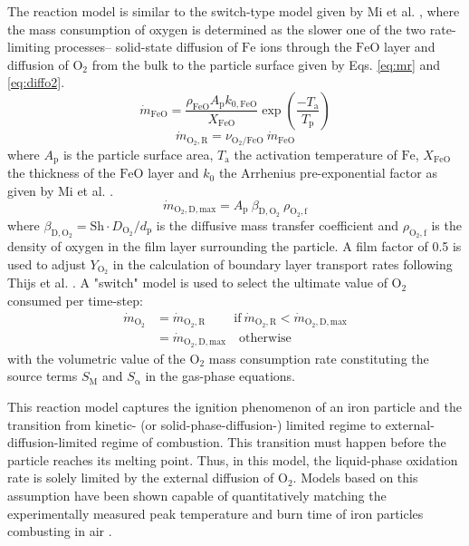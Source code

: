 \documentclass[twocolumn,10pt,dvipsnames]{article} %
\newcommand{\mrm}[1]{\mathrm{#1}}
\begin{document}
The reaction model is similar to the switch-type model given by Mi et al. \cite{mi2022quantitative,jean2023ignition}, where the mass consumption of oxygen is determined as the slower one of the two rate-limiting processes-- solid-state diffusion of $\mathrm{Fe}$ ions through the $\mrm{FeO}$ layer and diffusion of $\mrm{O_2}$ from the bulk to the particle surface given by Eqs. \ref{eq:mr} and \ref{eq:diffo2}.
\begin{equation}
    \dot{m}_\mrm{FeO} = \frac{\rho_\mrm{FeO} A_\mrm{p} k_\mrm{0,FeO}}{X_\mrm{FeO}} \exp \left( \frac{-T_\mrm{a}}{T_\mrm{p}}\right) 
\end{equation}
\begin{equation}
    \dot{m}_\mrm{O_2,R} = \nu_\mrm{O_2/FeO}\ \dot{m}_\mrm{FeO} \label{eq:mr}
\end{equation}
\noindent where $A_\mrm{p}$ is the particle surface area, $T_\mrm{a}$ the activation temperature of $\mrm{Fe}$, $X_\mrm{FeO}$ the thickness of the $\mrm{FeO}$ layer and $k_0$ the Arrhenius pre-exponential factor as given by Mi et al. \cite{mi2022quantitative}.
\begin{equation}
    \dot{m}_\mrm{O_2,D,max} = A_\mrm{p}\ \beta_\mrm{D,O_2}\ \rho_\mrm{O_2,f} \label{eq:diffo2}
\end{equation}
\noindent where $\beta_\mrm{D,O_2} = \mrm{Sh} \cdot D_\mrm{O_2} / d_\mrm{p}$ is the diffusive mass transfer coefficient and $\rho_\mrm{O_2,f}$ is the density of oxygen in the film layer surrounding the particle. A film factor of 0.5 is used to adjust $Y_\mrm{O_2}$ in the calculation of boundary layer transport rates following Thijs et al. \cite{Thijs2022}. A "switch" model is used to select the ultimate value of $\mrm{O_2}$ consumed per time-step:
\begin{equation}
    \begin{split}
        \dot{m}_\mrm{O_2} &= \dot{m}_\mrm{O_2,R}\quad\quad\: \mrm{if}\ \dot{m}_\mrm{O_2,R}<\dot{m}_\mrm{O_2,D,max} \\
        &= \dot{m}_\mrm{O_2,D,max} \quad \mrm{otherwise} \label{eq:mo2}
    \end{split}
\end{equation}
\noindent with the volumetric value of the $\mrm{O_2}$ mass consumption rate constituting the source terms $S_\mrm{M}$ and $S_\mrm{\alpha}$ in the gas-phase equations. 

This reaction model captures the ignition phenomenon of an iron particle and the transition from kinetic- (or solid-phase-diffusion-) limited regime to external-diffusion-limited regime of combustion. This transition must happen before the particle reaches its melting point. Thus, in this model, the liquid-phase oxidation rate is solely limited by the external diffusion of $\mrm{O_2}$. Models based on this assumption \cite{Thijsold, ThijsCNF, Thijs2022, FujinawaAECS} have been shown capable of quantitatively matching the experimentally measured peak temperature and burn time of iron particles combusting in air \cite{Ning, Panahi}.
\end{document}
